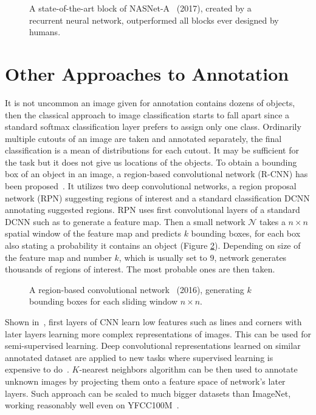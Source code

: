 \begin{figure}
	\centering
	
	
	\caption[A state-of-the-art block of NASNet-A]{A state-of-the-art block of NASNet-A~\cite{zoph2017learning} (2017), created by a recurrent neural network, outperformed all blocks ever designed by humans.}
	\label{fig:nasnet_block}
\end{figure}

\section{Other Approaches to Annotation}

It is not uncommon an image given for annotation contains dozens of objects, then the classical approach to image classification starts to fall apart since a standard softmax classification layer prefers to assign only one class. Ordinarily multiple cutouts of an image are taken and annotated separately, the final classification is a mean of distributions for each cutout. It may be sufficient for the task but it does not give us locations of the objects. To obtain a bounding box of an object in an image, a region-based convolutional network (R-CNN) has been proposed~\cite{ren2015faster}. It utilizes two deep convolutional networks, a region proposal network (RPN) suggesting regions of interest and a standard classification DCNN annotating suggested regions. RPN uses first convolutional layers of a standard DCNN such as \cite{simonyan2014very} to generate a feature map. Then a small network $\mathcal{N}$ takes a $n\times n$ spatial window of the feature map and predicts $k$ bounding boxes, for each box also stating a probability it contains an object (Figure \ref{fig:faster_RCNN}). Depending on size of the feature map and number $k$, which is usually set to $9$, network generates thousands of regions of interest. The most probable ones are then taken.


\begin{figure}
	\centering
	
	
	\caption[A region-based convolutional network]{A region-based convolutional network~\cite{ren2015faster} (2016), generating $k$ bounding boxes for each sliding window $n\times n$.}
	\label{fig:faster_RCNN}
\end{figure}

Shown in~\cite{zeiler2014visualizing}, first layers of CNN learn low features such as lines and corners with later layers learning more complex representations of images. This can be used for semi-supervised learning. Deep convolutional representations learned on similar annotated dataset are applied to new tasks where supervised learning is expensive to do~\cite{donahue2014decaf}. $K$-nearest neighbors algorithm can be then used to annotate unknown images by projecting them onto a feature space of network's later layers. Such approach can be scaled to much bigger datasets than ImageNet, working reasonably well even on YFCC100M~\cite{amato2017searching}.
